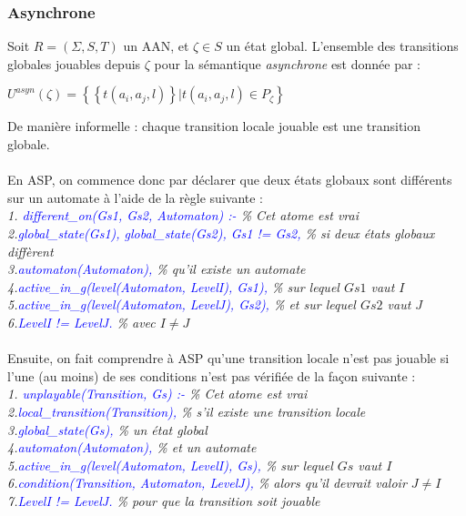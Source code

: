 \documentclass[12pt,a4paper]{article}
\begin{document}
\subsubsection{Asynchrone}
Soit $R = (\Sigma,S,T)$ un AAN, et $\zeta\in S$ un état global. L'ensemble des transitions globales jouables depuis $\zeta$ pour la sémantique \emph{asynchrone} est donnée par :
\begin{center}
	$U^{asyn}(\zeta)=\left\{\left\{t(a_i,a_j,l)\right\}|t(a_i,a_j,l)\in P_{\zeta}\right\}$
\end{center}
De manière informelle : chaque transition locale jouable est une transition globale.\\ \\
En ASP, on commence donc par déclarer que deux états globaux sont différents sur un automate à l'aide de la règle suivante :\\
\emph{
1. \textcolor{blue}{different\_on(Gs1, Gs2, Automaton) :-} \% Cet atome est vrai\\
2.\qquad \textcolor{blue}{global\_state(Gs1), global\_state(Gs2), Gs1 != Gs2,} \% si deux états globaux diffèrent\\
3.\qquad \textcolor{blue}{automaton(Automaton),} \% qu'il existe un automate\\
4.\qquad \textcolor{blue}{active\_in\_g(level(Automaton, LevelI), Gs1),} \% sur lequel $Gs1$ vaut $I$\\
5.\qquad \textcolor{blue}{active\_in\_g(level(Automaton, LevelJ), Gs2),} \% et sur lequel $Gs2$ vaut $J$\\
6.\qquad \textcolor{blue}{LevelI != LevelJ.} \% avec $I \neq J$\\ \\
}
Ensuite, on fait comprendre à ASP qu'une transition locale n'est pas jouable si l'une (au moins) de ses conditions n'est pas vérifiée de la façon suivante :\\
\emph{
1. \textcolor{blue}{unplayable(Transition, Gs) :-} \% Cet atome est vrai\\
2.\qquad \textcolor{blue}{local\_transition(Transition),} \% s'il existe une transition locale\\
3.\qquad \textcolor{blue}{global\_state(Gs),} \% un état global\\
4.\qquad \textcolor{blue}{automaton(Automaton),} \% et un automate\\
5.\qquad \textcolor{blue}{active\_in\_g(level(Automaton, LevelI), Gs),} \% sur lequel $Gs$ vaut $I$\\
6.\qquad \textcolor{blue}{condition(Transition, Automaton, LevelJ),} \% alors qu'il devrait valoir $J\neq I$\\
7.\qquad \textcolor{blue}{LevelI != LevelJ.} \% pour que la transition soit jouable\\ \\
}
\end{document}
